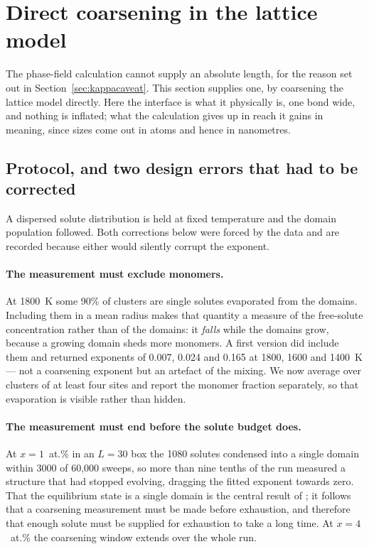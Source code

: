 \documentclass[preprint,12pt,authoryear]{elsarticle}
\begin{document}
\section{Direct coarsening in the lattice model}
\label{sec:latticecoarsen}

The phase-field calculation cannot supply an absolute length, for the reason set
out in Section~\ref{sec:kappacaveat}. This section supplies one, by coarsening
the lattice model directly. Here the interface is what it physically is, one
bond wide, and nothing is inflated; what the calculation gives up in reach it
gains in meaning, since sizes come out in atoms and hence in nanometres.

\subsection{Protocol, and two design errors that had to be corrected}

A dispersed solute distribution is held at fixed temperature and the domain
population followed. Both corrections below were forced by the data and are
recorded because either would silently corrupt the exponent.

\paragraph{The measurement must exclude monomers.} At 1800~K some 90\% of
clusters are single solutes evaporated from the domains. Including them in a
mean radius makes that quantity a measure of the free-solute concentration
rather than of the domains: it \emph{falls} while the domains grow, because a
growing domain sheds more monomers. A first version did include them and
returned exponents of 0.007, 0.024 and 0.165 at 1800, 1600 and 1400~K --- not a
coarsening exponent but an artefact of the mixing. We now average over clusters
of at least four sites and report the monomer fraction separately, so that
evaporation is visible rather than hidden.

\paragraph{The measurement must end before the solute budget does.} At
$x = 1$~at.\% in an $L = 30$ box the 1080 solutes condensed into a single domain
within 3000 of 60{,}000 sweeps, so more than nine tenths of the run measured a
structure that had stopped evolving, dragging the fitted exponent towards zero.
That the equilibrium state is a single domain is the central result of
\citet{yu2026b}; it follows that a coarsening measurement must be made before
exhaustion, and therefore that enough solute must be supplied for exhaustion to
take a long time. At $x = 4$~at.\% the coarsening window extends over the whole
run.
\end{document}
